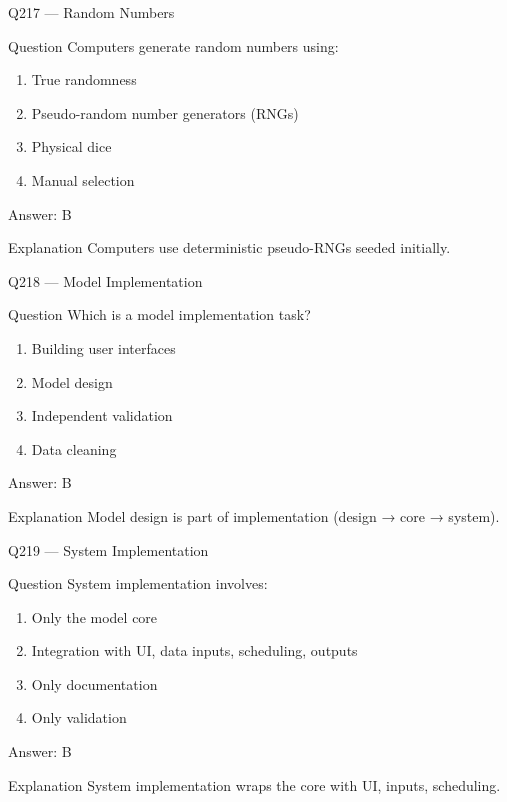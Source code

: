 \documentclass[aspectratio=169,8pt]{beamer}
\begin{document}
\begin{frame}{Q217 --- Random Numbers}
\begin{block}{Question}
Computers generate random numbers using:
\begin{enumerate}
\item True randomness
\item Pseudo-random number generators (RNGs)
\item Physical dice
\item Manual selection
\end{enumerate}
\end{block}
\begin{exampleblock}{Answer: B}\end{exampleblock}
\begin{block}{Explanation}
Computers use deterministic pseudo-RNGs seeded initially.
\end{block}
\end{frame}

\begin{frame}{Q218 --- Model Implementation}
\begin{block}{Question}
Which is a model implementation task?
\begin{enumerate}
\item Building user interfaces
\item Model design
\item Independent validation
\item Data cleaning
\end{enumerate}
\end{block}
\begin{exampleblock}{Answer: B}\end{exampleblock}
\begin{block}{Explanation}
Model design is part of implementation (design → core → system).
\end{block}
\end{frame}

\begin{frame}{Q219 --- System Implementation}
\begin{block}{Question}
System implementation involves:
\begin{enumerate}
\item Only the model core
\item Integration with UI, data inputs, scheduling, outputs
\item Only documentation
\item Only validation
\end{enumerate}
\end{block}
\begin{exampleblock}{Answer: B}\end{exampleblock}
\begin{block}{Explanation}
System implementation wraps the core with UI, inputs, scheduling.
\end{block}
\end{frame}
\end{document}
